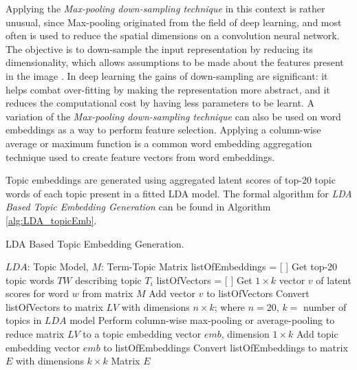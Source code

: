             Applying the \emph{Max-pooling down-sampling technique} in this context is rather unusual, since Max-pooling originated from the field of deep learning, and most often is used to reduce the spatial dimensions on a convolution neural network. The objective is to down-sample the input representation by reducing its dimensionality, which allows assumptions to be made about the features present in the image \cite{maxPooling}. In deep learning the gains of down-sampling are significant: it helps combat over-fitting by making the representation more abstract, and it reduces the computational cost by having less parameters to be learnt. A variation of the \emph{Max-pooling down-sampling technique} can also be used on word embeddings as a way to perform feature selection. Applying a column-wise average or maximum function is a common word embedding aggregation technique \cite{de2016representation} used to create feature vectors from word embeddings.
                    
            Topic embeddings are generated using aggregated latent scores of top-20 topic words of each topic present in a fitted LDA model. The formal algorithm for \emph{LDA Based Topic Embedding Generation} can be found in Algorithm \ref{alg:LDA_topicEmb}. 
        
            \begin{algorithm}
                \caption{LDA Based Topic Embedding Generation.}
                \label{alg:LDA_topicEmb}
                \begin{algorithmic}[1]
                    \REQUIRE $LDA$: Topic Model, $M$: Term-Topic Matrix
                    \STATE listOfEmbeddings = [ ]
                        \STATE Get top-20 topic words $TW$ describing topic $T_i$
                        \STATE listOfVectors = [ ]
                        \STATE
                            \STATE Get $1 \times k$ vector $v$ of latent scores for word $w$ from matrix $M$
                            \STATE Add vector $v$ to listOfVectors
                        \ENDFOR
                        \STATE Convert listOfVectors to matrix $LV$ with dimensions $n \times k$; where $n=20$, $k=$ number of topics in $LDA$ model
                        \STATE Perform column-wise max-pooling or average-pooling to reduce matrix $LV$ to a topic embedding vector $emb$, dimension $1 \times k$
                        \STATE Add topic embedding vector $emb$ to listOfEmbeddings
                    \ENDFOR
                    \STATE Convert listOfEmbeddings to matrix $E$ with dimensions $k \times k$
                    \RETURN Matrix $E$
                \end{algorithmic}
            \end{algorithm}
            
